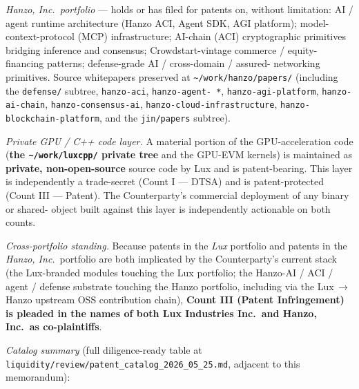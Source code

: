 \documentclass[11pt,letterpaper]{article}
\begin{document}
\textit{Hanzo, Inc.\ portfolio} --- holds or has filed for patents
on, without limitation: AI / agent runtime architecture (Hanzo
ACI, Agent SDK, AGI platform); model-context-protocol (MCP)
infrastructure; AI-chain (ACI) cryptographic primitives bridging
inference and consensus; Crowdstart-vintage commerce / equity-
financing patterns; defense-grade AI / cross-domain / assured-
networking primitives. Source whitepapers preserved at
\texttt{\textasciitilde/work/hanzo/papers/} (including the
\texttt{defense/} subtree, \texttt{hanzo-aci}, \texttt{hanzo-agent-
*}, \texttt{hanzo-agi-platform}, \texttt{hanzo-ai-chain},
\texttt{hanzo-consensus-ai}, \texttt{hanzo-cloud-infrastructure},
\texttt{hanzo-blockchain-platform}, and the \texttt{jin/papers}
subtree).

\textit{Private GPU / C++ code layer.} A material portion of the
GPU-acceleration code (\textbf{the \texttt{\textasciitilde/work/luxcpp/}
private tree} and the GPU-EVM kernels) is maintained as
\textbf{private, non-open-source} source code by Lux and is
patent-bearing. This layer is independently a trade-secret
(Count I --- DTSA) and is patent-protected (Count III --- Patent).
The Counterparty's commercial deployment of any binary or shared-
object built against this layer is independently actionable on
both counts.

\textit{Cross-portfolio standing.} Because patents in the \emph{Lux}
portfolio and patents in the \emph{Hanzo, Inc.}\ portfolio are both
implicated by the Counterparty's current stack (the Lux-branded
modules touching the Lux portfolio; the Hanzo-AI / ACI / agent /
defense substrate touching the Hanzo portfolio, including via the
Lux\,$\to$\,Hanzo upstream OSS contribution chain), \textbf{Count III
(Patent Infringement) is pleaded in the names of both Lux Industries
Inc.\ and Hanzo, Inc.\ as co-plaintiffs}.

\textit{Catalog summary} (full diligence-ready table at
\texttt{liquidity/review/patent\_catalog\_2026\_05\_25.md}, adjacent
to this memorandum):
\end{document}
